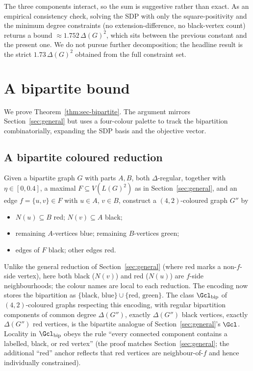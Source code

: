 \documentclass[11pt,a4paper]{article}
\theoremstyle{definition}
\theoremstyle{remark}
\begin{document}
The three components interact, so the sum is suggestive rather than
exact. As an empirical consistency check, solving the SDP with only the
square-positivity and the minimum degree constraints (no
extension-difference, no black-vertex count) returns a bound
$\approx 1.752\,\Delta(G)^2$, which sits between the previous constant and
the present one. We do not pursue further decomposition; the headline
result is the strict $1.73\,\Delta(G)^2$ obtained from the full
constraint set.

\section{A bipartite bound}
\label{sec:bipartite}

We prove Theorem~\ref{thm:sec-bipartite}. The argument mirrors
Section~\ref{sec:general} but uses a four-colour palette to track
the bipartition combinatorially, expanding the SDP basis and the
objective vector.

\subsection{A bipartite coloured reduction}

Given a bipartite graph $G$ with parts $A, B$, both $\Delta$-regular,
together with $\eta \in [0, 0.4]$, a maximal $F \subseteq V(L(G)^2)$
as in Section~\ref{sec:general}, and an edge $f = \{u, v\} \in F$
with $u \in A$, $v \in B$, construct a $(4,2)$-coloured graph $G''$
by
\begin{itemize}
\item $N(u) \subseteq B$ red; $N(v) \subseteq A$ black;
\item remaining $A$-vertices blue; remaining $B$-vertices green;
\item edges of $F$ black; other edges red.
\end{itemize}
Unlike the general reduction of Section~\ref{sec:general} (where red
marks a non-$f$-side vertex), here both black ($N(v)$) and red ($N(u)$)
are $f$-side neighbourhoods; the colour names are local to each
reduction.
The encoding now stores the bipartition as
$\{\text{black, blue}\} \cup \{\text{red, green}\}$. The class
$\Gcl_{\mathrm{bip}}$ of $(4,2)$-coloured graphs respecting this
encoding, with regular bipartition components of common degree
$\Delta(G'')$, exactly $\Delta(G'')$ black vertices, exactly
$\Delta(G'')$ red vertices, is the bipartite analogue of
Section~\ref{sec:general}'s $\Gcl$. Locality in $\Gcl_{\mathrm{bip}}$ obeys the rule
``every connected component contains a labelled, black, or red
vertex'' (the proof matches Section~\ref{sec:general}; the
additional ``red'' anchor reflects that red vertices are
neighbour-of-$f$ and hence individually constrained).
\end{document}
